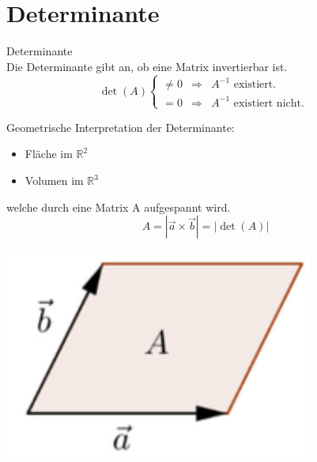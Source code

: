 \graphicspath{{images/}}

\section{Determinante}

    \begin{definition}{Determinante}\\
        Die Determinante gibt an, ob eine Matrix invertierbar ist.
        \begin{equation*}
            \det(A)
            \left\{
                \begin{array}{lll}
                    \neq 0   &\Rightarrow    & A^{-1} \text{ existiert. }\\
                    = 0     &\Rightarrow    & A^{-1} \text{ existiert nicht. }
                \end{array}
            \right.
        \end{equation*}
    \end{definition}

    

    \begin{definition}{Geometrische Interpretation} der Determinante:\\
        \begin{minipage}{0.6\linewidth}
        \begin{itemize}
            \item Fläche im $\mathbb{R}^2$
            \item Volumen im $\mathbb{R}^3$
        \end{itemize}
        welche durch eine Matrix A aufgespannt wird.
        $$A = |\vec{a} \times \vec{b}| = |\det(A)|$$
        \end{minipage}
        \begin{minipage}{0.35\linewidth}
            \includegraphics[width=0.9\linewidth]{determinante.png}
        \end{minipage}
    \end{definition}

